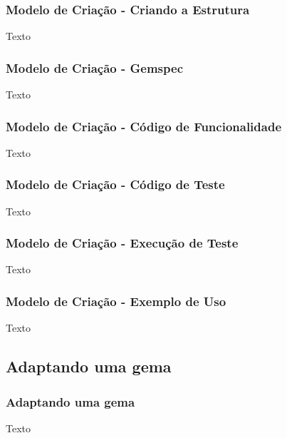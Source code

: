 \begin{frame}
\frametitle{Modelo de Criação - Criando a Estrutura}
 Texto
\end{frame}

\begin{frame}
\frametitle{Modelo de Criação - Gemspec}
 Texto
\end{frame}

\begin{frame}
\frametitle{Modelo de Criação - Código de Funcionalidade}
 Texto
\end{frame}

\begin{frame}
\frametitle{Modelo de Criação - Código de Teste}
 Texto
\end{frame}

\begin{frame}
\frametitle{Modelo de Criação - Execução de Teste}
 Texto
\end{frame}

\begin{frame}
\frametitle{Modelo de Criação - Exemplo de Uso}
 Texto
\end{frame}

\subsection{Adaptando uma gema}
\begin{frame}
\frametitle{Adaptando uma gema}
Texto
\end{frame}